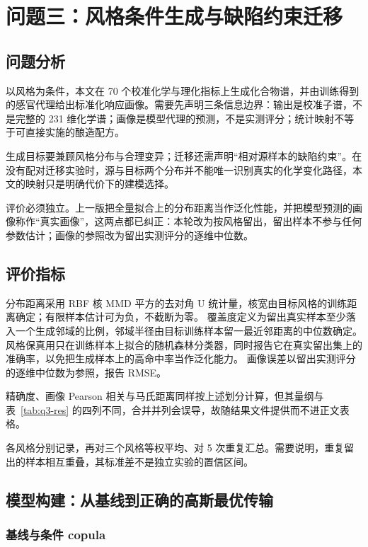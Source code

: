 \documentclass[UTF8,a4paper,zihao=-4]{ctexart}
\numberwithin{figure}{section}
\numberwithin{table}{section}
\numberwithin{equation}{section}
\begin{document}
\section{问题三：风格条件生成与缺陷约束迁移}
\label{sec:q3}

\subsection{问题分析}

以风格为条件，本文在 70 个校准化学与理化指标上生成化合物谱，并由训练得到的感官代理给出标准化响应画像。需要先声明三条信息边界：输出是校准子谱，不是完整的 231 维化学谱；画像是模型代理的预测，不是实测评分；统计映射不等于可直接实施的酿造配方。

生成目标要兼顾风格分布与合理变异；迁移还需声明“相对源样本的缺陷约束”。在没有配对迁移实验时，源与目标两个分布并不能唯一识别真实的化学变化路径，本文的映射只是明确代价下的建模选择。

评价必须独立。上一版把全量拟合上的分布距离当作泛化性能，并把模型预测的画像称作“真实画像”，这两点都已纠正：本轮改为按风格留出，留出样本不参与任何参数估计；画像的参照改为留出实测评分的逐维中位数。

\subsection{评价指标}

分布距离采用 RBF 核 MMD 平方的去对角 U 统计量，核宽由目标风格的训练距离确定；有限样本估计可为负，不截断为零。
覆盖度定义为留出真实样本至少落入一个生成邻域的比例，邻域半径由目标训练样本留一最近邻距离的中位数确定。
风格保真用只在训练样本上拟合的随机森林分类器，同时报告它在真实留出集上的准确率，以免把生成样本上的高命中率当作泛化能力。
画像误差以留出实测评分的逐维中位数为参照，报告 RMSE。

精确度、画像 Pearson 相关与马氏距离同样按上述划分计算，但其量纲与表~\ref{tab:q3-res} 的四列不同，合并并列会误导，故随结果文件提供而不进正文表格。

各风格分别记录，再对三个风格等权平均、对 5 次重复汇总。需要说明，重复留出的样本相互重叠，其标准差不是独立实验的置信区间。

\subsection{模型构建：从基线到正确的高斯最优传输}

\subsubsection{基线与条件 copula}
\end{document}
